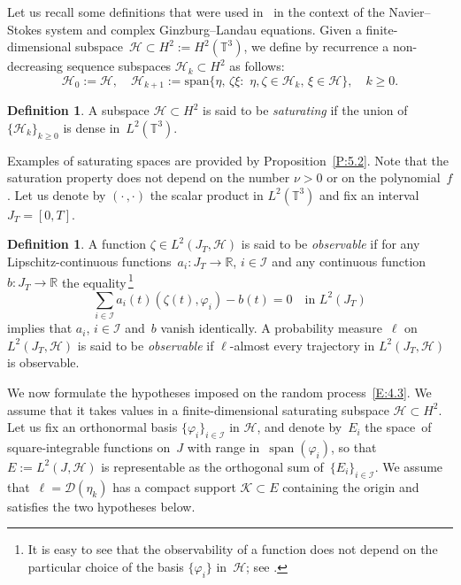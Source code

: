 \documentclass[11pt]{article}
\theoremstyle{plain}
\theoremstyle{definition}
\newtheorem{definition}[theorem]{Definition}
\let\mathcal\mathscr
\theoremstyle{plain}
\numberwithin{equation}{section}
\newcommand{\R}{{\mathbb R}}
\newcommand{\T}{{\mathbb T}}
\DeclareMathOperator{\lspan}{span}
\newcommand{\DD}{{\mathcal D}}
\newcommand{\HH}{{\mathcal H}}
\newcommand{\II}{{\mathcal I}}
\newcommand{\KK}{{\mathcal K}}
\begin{document}
Let us recall some definitions that were used in~\cite{KNS-2020} in the context of the Navier--Stokes system and complex Ginzburg--Landau equations. Given a finite-dimensional subspace~$\HH\subset H^2:=H^2(\T^3)$, we define by recurrence a non-decreasing sequence subspaces $\HH_k\subset H^2$ as follows:
\begin{equation} \label{Hk}
\HH_0:=\HH, \quad \HH_{k+1}:=\text{span}\{\eta,\,\zeta\xi: \,\,\eta,\zeta\in\HH_k,\,\xi\in\HH\},\quad k\ge0.
\end{equation}

\begin{definition}\label{D:4.1}
A subspace $\HH\subset H^2$ is said to be \emph{saturating} if the union of~$\{\HH_k\}_{k\ge0}$ is dense in~$L^2(\T^3)$.
\end{definition}

Examples of saturating spaces are provided by Proposition~\ref{P:5.2}. Note that the saturation property does not depend on the number $\nu>0$ or on the polynomial~$f$. Let us denote by $(\cdot\,,\cdot)$ the scalar product in $L^2(\T^3)$ and fix an interval $J_T=[0,T]$.

\begin{definition} \label{D:4.2}
A function $\zeta\in L^2(J_T,\HH)$ is said to be \emph{observable} if for any Lipschitz-continuous functions~$a_i:J_T\to\R$, $i\in\II$ and any continuous function $b:J_T\to\R$ the equality\,\footnote{It is easy to see that the observability of a function does not depend on the particular choice of the basis $\{\varphi_i\}$ in~$\HH$; see \cite[Rem.\,1.4]{KNS-2020}.}
\[
\sum_{i\in\II}a_i(t)(\zeta(t),\varphi_i)-b(t)=0\quad\text{in $L^2(J_T)$}
\]
implies that $a_i$, $i\in\II$ and~$b$ vanish identically. A probability measure~$\ell$ on~$L^2(J_T,\HH)$ is said to be \emph{observable} if $\ell$-almost every trajectory in $L^2(J_T,\HH)$ is observable.
\end{definition}

We now formulate the hypotheses imposed on the random process~\eqref{E:4.3}. We assume that it takes values in a finite-dimensional saturating subspace $\HH\subset H^2$. Let us fix an orthonormal basis $\{\varphi_i\}_{i\in\II}$ in $\HH$, and denote by~$E_i$ the space~of square-integrable functions on~$J$ with range in~$\lspan(\varphi_i)$, so that $E:=L^2(J,\HH)$ is representable as the orthogonal sum of~$\{E_i\}_{i\in\II}$. We assume that~$\ell=\DD(\eta_k)$ has a compact support $\KK\subset E$ containing the origin and satisfies the two hypotheses below.
\end{document}
